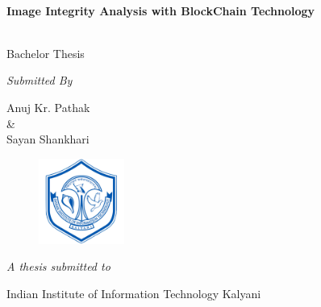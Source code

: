 \begin{titlepage}

\begin{center}
\HRule \\[0.4cm]
{\huge \bfseries \textbf{Image Integrity Analysis with BlockChain Technology}  \\[0.4cm] }
\HRule \\[1cm]
\end{center}

\vspace{0.2cm}

\begin{center}
{\large{Bachelor Thesis}}
\end{center}

\vspace{0.25cm}

\begin{center}
\large{\textit{Submitted By}}
\end{center}

\vspace{0.35cm}

\begin{center}
{\large{Anuj Kr. Pathak\\\&\\Sayan Shankhari}}
\end{center}

\vspace{0.25cm}

\begin{figure}[h]
\centering
\includegraphics[width=0.25\textwidth]{./img_src/iiitk.png}
\end{figure}

\vspace{0.5cm}

\begin{center}
{\textit{\Large{A thesis submitted to}}} \\
\end{center}

\vspace{0.25cm}

\begin{center}
\Large{Indian Institute of Information Technology Kalyani} \\
\end{center}


\end{titlepage}
